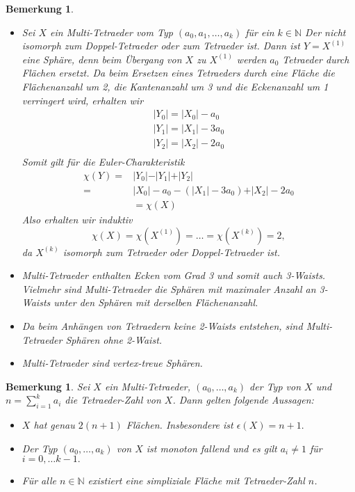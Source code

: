 \documentclass[12pt,titlepage,twoside,cleardoublepage]{article}
\theoremstyle{nummermitklammern}
\newtheorem{bemerkung}[temp]{Bemerkung}
\newtheorem{bemerkung}[zahl]{Bemerkung}
\numberwithin{equation}{section}
\begin{document}
\begin{bemerkung}
\begin{itemize}
\item Sei $X$ ein Multi-Tetraeder vom Typ $(a_0,a_1,\ldots,a_k)$ für ein $k\in \mathbb{N}$ Der nicht isomorph zum Doppel-Tetraeder oder zum Tetraeder ist. Dann ist $Y=X^{(1)}$ eine Sphäre, denn beim Übergang von $X$ zu $X^{(1)}$ werden $a_0$ Tetraeder durch Flächen ersetzt. Da beim Ersetzen eines Tetraeders durch eine Fläche die Flächenanzahl um 2, die Kantenanzahl um 3 und die Eckenanzahl um 1 verringert wird, erhalten wir  
\begin{align*}
\vert Y_0\vert =\vert X_0\vert-a_0\\
\vert Y_1\vert=\vert X_1\vert-3a_0\\
\vert Y_2\vert=\vert X_2\vert-2a_0\\
\end{align*}
Somit gilt für die Euler-Charakteristik
\begin{align*}
\chi(Y)=&\vert Y_0\vert -\vert Y_1\vert+\vert Y_2\vert\\
=&\vert X_0\vert-a_0-(\vert X_1\vert-3a_0)+\vert X_2\vert-2a_0\\
&=\chi (X)
\end{align*}
Also erhalten wir induktiv 
\[
\chi(X)=\chi(X^{(1)})=\ldots=\chi(X^{(k)})=2,
\]
da $X^{(k)}$ isomorph zum Tetraeder oder Doppel-Tetraeder ist.
\item Multi-Tetraeder enthalten Ecken vom Grad 3 und somit auch 3-Waists. Vielmehr sind Multi-Tetraeder die Sphären mit maximaler Anzahl an 3-Waists unter den Sphären mit derselben Flächenanzahl.

\item
Da beim Anhängen von Tetraedern keine 2-Waists entstehen, sind Multi-Tetraeder Sphären ohne 2-Waist.
\item
Multi-Tetraeder sind vertex-treue Sphären.
\end{itemize}
\end{bemerkung}
\begin{bemerkung}
Sei $X$ ein Multi-Tetraeder, $(a_0,\ldots,a_k)$ der Typ von $X$ und $n=\sum_{i=1}^{k}a_i$ die Tetraeder-Zahl von $X$. Dann gelten folgende Aussagen: 
\begin{itemize}
\item $X$ hat genau $2(n+1)$ Flächen. Insbesondere ist $\epsilon(X)=n+1.$
\item Der Typ $(a_0,\ldots,a_k)$ von $X$ ist monoton fallend und es gilt $a_i\neq 1$ für $i=0,\ldots k-1.$
\item  Für alle $n \in \mathbb{N}$ existiert eine simpliziale Fläche mit Tetraeder-Zahl $n$.
\end{itemize}
\end{bemerkung}
\end{document}
